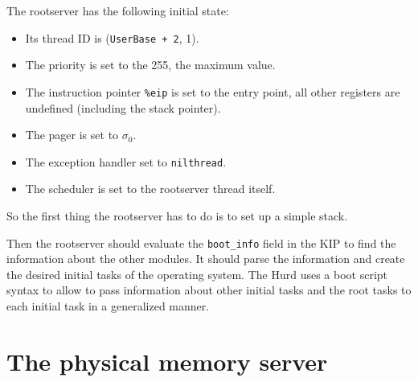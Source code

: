 The rootserver has the following initial state:

\begin{itemize}
\item Its thread ID is (\verb/UserBase + 2/, 1).

\item The priority is set to the 255, the maximum value.

  \begin{comment}
    The rootserver, or at least the system call wrapper, should run at
    a very high priority.
  \end{comment}

\item The instruction pointer \verb/%eip/ is set to the entry point,
all other registers are undefined (including the stack pointer).

\item The pager is set to $\sigma_0$.
  
\item The exception handler set to \verb/nilthread/.
  
\item The scheduler is set to the rootserver thread itself.
\end{itemize}

So the first thing the rootserver has to do is to set up a simple
stack.

Then the rootserver should evaluate the \verb/boot_info/ field in the
KIP to find the information about the other modules.  It should parse
the information and create the desired initial tasks of the operating
system.  The Hurd uses a boot script syntax to allow to pass
information about other initial tasks and the root tasks to each
initial task in a generalized manner.

\begin{comment}
  The exact number and type of initial tasks necessary to boot the
  Hurd are not yet known.  Chances are that this list includes the
  \texttt{task} server, the physical memory server, the device
  servers, and the boot filesystem.  The boot filesystem might be a
  small simple filesystem, which also includes the device drivers
  needed to access the real root filesystem.
\end{comment}


\section{The physical memory server}


